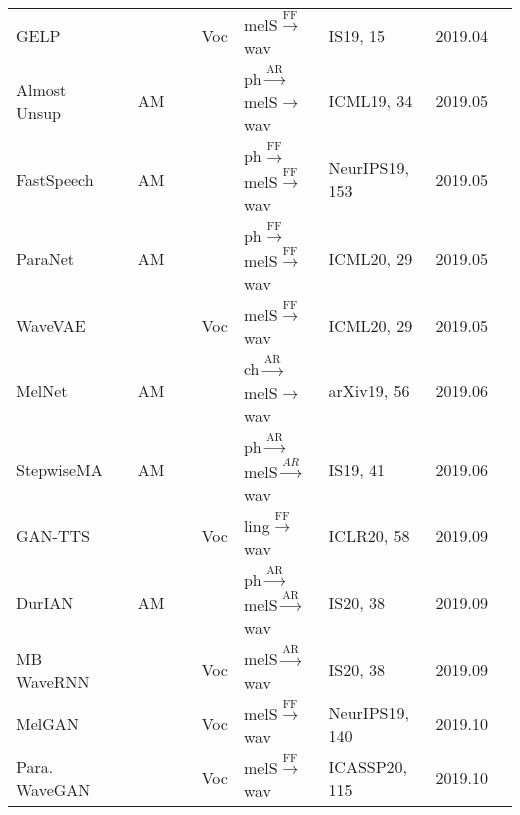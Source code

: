 \documentclass{article}
\begin{document}
\begin{center}
\begin{longtable}{l | l | l | l | l | l }
		GELP~\cite{juvela2019gelp}                   & ~~~~~~~~Voc      & {\color{red}melS}$\stackrel{\text{FF}}{\longrightarrow}$wav          &IS19, 15& 2019.04         \\
		Almost Unsup~\cite{ren2019almost}             & AM       & {\color{blue}ph}$\stackrel{\text{AR}}{\longrightarrow}${\color{red}melS}$\rightarrow$wav               & ICML19, 34 & 2019.05         \\
		FastSpeech~\cite{ren2019fastspeech}             & AM       & {\color{blue}ph}$\stackrel{\text{FF}}{\longrightarrow}${\color{red}melS}$\stackrel{\text{FF}}{\longrightarrow}$wav               & NeurIPS19, 153 & 2019.05         \\
		ParaNet~\cite{peng2020non}                & AM     & {\color{blue}ph}$\stackrel{\text{FF}}{\longrightarrow}${\color{red}melS}$\stackrel{\text{FF}}{\longrightarrow}$wav               & ICML20, 29 & 2019.05        \\
		WaveVAE~\cite{peng2020non}                & ~~~~~~~~Voc     & {\color{red}melS}$\stackrel{\text{FF}}{\longrightarrow}$wav               & ICML20, 29 & 2019.05        \\
		MelNet~\cite{vasquez2019melnet}                 & AM       &{\color{blue}ch}$\stackrel{\text{AR}}{\longrightarrow}${\color{red}melS}$\stackrel{}{\longrightarrow}$wav               & arXiv19, 56 & 2019.06        \\
		StepwiseMA~\cite{he2019robust}            & AM       &{\color{blue}ph}$\stackrel{\text{AR}}{\longrightarrow}${\color{red}melS}$\stackrel{AR}{\longrightarrow}$wav               & IS19, 41 & 2019.06        \\
		GAN-TTS~\cite{binkowski2019high}                & ~~~~~~~~Voc      & {\color{green}ling}$\stackrel{\text{FF}}{\longrightarrow}$wav   & ICLR20, 58 & 2019.09        \\
		DurIAN~\cite{yu2020durian}                 & AM & {\color{blue}ph}$\stackrel{\text{AR}}{\longrightarrow}${\color{red}melS}$\stackrel{\text{AR}}{\longrightarrow}$wav          &IS20, 38& 2019.09         \\
		MB WaveRNN~\cite{yu2020durian}            & ~~~~~~~~Voc & {\color{red}melS}$\stackrel{\text{AR}}{\longrightarrow}$wav          &IS20, 38& 2019.09         \\
		MelGAN~\cite{kumar2019melgan}                 & ~~~~~~~~Voc      & {\color{red}melS}$\stackrel{\text{FF}}{\longrightarrow}$wav   & NeurIPS19, 140 & 2019.10         \\
		Para. WaveGAN~\cite{yamamoto2020parallel}       & ~~~~~~~~Voc      & {\color{red}melS}$\stackrel{\text{FF}}{\longrightarrow}$wav   & ICASSP20, 115 & 2019.10        \\

\end{longtable}
\end{center}
\end{document}
